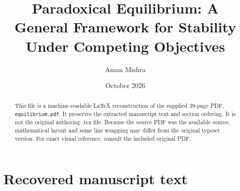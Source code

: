 \documentclass[10pt,a4paper]{article}
\title{Paradoxical Equilibrium: A General Framework for Stability Under Competing Objectives}
\author{Aman Mishra}
\date{October 2026}
\begin{document}
\maketitle
\begin{abstract}
This file is a machine-readable LaTeX reconstruction of the supplied 39-page PDF, 
\texttt{equilibrium.pdf}. It preserves the extracted manuscript text and section ordering.
It is not the original authoring .tex file. Because the source PDF was the available source, 
mathematical layout and some line wrapping may differ from the original typeset version.
For exact visual reference, consult the included original PDF.
\end{abstract}
\tableofcontents
\clearpage
\section*{Recovered manuscript text}
\end{document}
